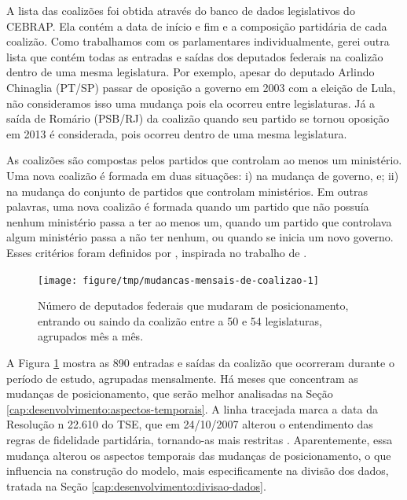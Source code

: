 \documentclass[a4paper,titlepage]{ppgi}\usepackage[]{graphicx}\usepackage[]{color}
\newenvironment{knitrout}{}{} %
\begin{document}
A lista das coalizões foi obtida através do banco de dados
legislativos do \gls{CEBRAP}. Ela contém a data de início e fim e a composição
partidária de cada coalizão. Como trabalhamos com os parlamentares
individualmente, gerei outra lista que contém todas as entradas e saídas dos
deputados federais na coalizão dentro de uma mesma legislatura. Por exemplo,
apesar do deputado Arlindo Chinaglia (PT/SP) passar de oposição a governo
em 2003 com a eleição de Lula, não consideramos isso uma mudança pois ela
ocorreu entre legislaturas. Já a saída de Romário (PSB/RJ) da coalizão quando
seu partido se tornou oposição em 2013 é considerada, pois ocorreu dentro de
uma mesma legislatura.

As coalizões são compostas pelos partidos que controlam ao menos um ministério.
Uma nova coalizão é formada em duas situações: i) na mudança de governo, e;
ii) na mudança do conjunto de partidos que controlam ministérios. Em outras
palavras, uma nova coalizão é formada quando um partido que não possuía nenhum
ministério passa a ter ao menos um, quando um partido que controlava algum
ministério passa a não ter nenhum, ou quando se inicia um novo governo.
Esses critérios foram definidos por , inspirada no
trabalho de .

\begin{knitrout}
\color{fgcolor}\begin{figure}
\texttt{[image: figure/tmp/mudancas-mensais-de-coalizao-1]} \caption[Número de deputados federais que mudaram de posicionamento, entrando ou saindo da coalizão entre a 50\textordfeminine{} e 54\textordfeminine{} legislaturas, agrupados mês a mês]{Número de deputados federais que mudaram de posicionamento, entrando ou saindo da coalizão entre a 50\textordfeminine{} e 54\textordfeminine{} legislaturas, agrupados mês a mês.}\label{fig:mudancas-mensais-de-coalizao}
\end{figure}


\end{knitrout}

A Figura \ref{fig:mudancas-mensais-de-coalizao} mostra as
890 entradas e saídas da coalizão que ocorreram
durante o período de estudo, agrupadas mensalmente. Há meses que concentram
as mudanças de posicionamento, que serão melhor analisadas na Seção
\ref{cap:desenvolvimento:aspectos-temporais}. A linha tracejada marca a data da Resolução
n\textordmasculine{} 22.610 do TSE, que em 24/10/2007
alterou o entendimento das regras de fidelidade partidária, tornando-as mais
restritas \cite{TSE2007}. Aparentemente, essa mudança alterou os aspectos
temporais das mudanças de posicionamento, o que influencia na construção do
modelo, mais especificamente na divisão dos dados, tratada na Seção
\ref{cap:desenvolvimento:divisao-dados}.
\end{document}
